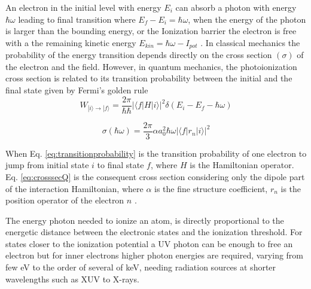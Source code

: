An electron in the initial level with energy $E_{i}$ can absorb a photon with energy $\hbar \omega$ leading to final transition where $E_{f}-E_{i}=\hbar \omega$, when the energy of the photon is larger than the bounding energy, or the Ionization barrier the electron is free with a the remaining kinetic energy $E_{kin} = \hbar \omega - I_{pot}$ \cite{becker_vuv_1996}.
In classical mechanics the probability of the energy transition depends directly on the cross section $(\sigma)$ of the electron and the field. However, in quantum mechanics, the photoionization cross section is related to its transition probability between the initial and the final state given by Fermi’s golden rule
 \begin{equation} 
 \label{eq:transitionprobability}
W_{|i\rangle \rightarrow |f\rangle} = \frac{2\pi}{\hbar\hbar} |\langle f|H|i\rangle|^{2} \delta(E_{i} - E_{f}-\hbar\omega)
 \end{equation}
 
 \begin{equation}
 \label{eq:crosssecQ}
 \sigma(\hbar \omega) = \frac{2\pi}{3} \alpha a_{0}^{2} \hbar \omega |\langle f|r_{n}|i\rangle|^{2}
 \end{equation}
 
When Eq. \ref{eq:transitionprobability} is the transition probability of one electron to jump from initial state $i$ to final state $f$, where $H$ is the Hamiltonian operator. Eq. \ref{eq:crosssecQ} is the consequent cross section considering only the dipole part of the interaction Hamiltonian, where $\alpha$ is the fine structure coefficient, $r_{n}$ is the position operator of the electron $n$ \cite{fermi_quantum_1932}.

The energy photon needed to ionize an atom, is directly proportional to the energetic distance between the electronic states and the ionization threshold. For states closer to the ionization potential a UV photon can be enough to free an electron but for inner electrons higher photon energies are required, varying from few eV to the order of several of keV, needing radiation sources at shorter wavelengths such as XUV to X-rays.\cite{becker_vuv_1996}

